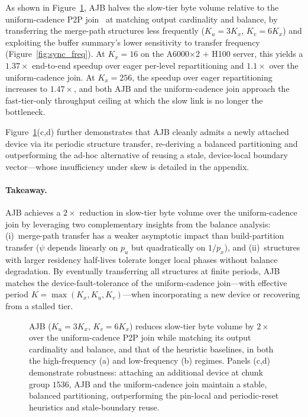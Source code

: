 \documentclass{article}
\begin{document}
As shown in Figure~\ref{fig:comms}, AJB halves the slow-tier byte volume
relative to the uniform-cadence P2P join~\citep{maltry2025multigpu} at matching
output cardinality and balance, by transferring the merge-path structures less
frequently ($K_u = 3K_x$, $K_v = 6K_x$) and exploiting the buffer summary's
lower sensitivity to transfer frequency (Figure~\ref{fig:sync_freq}). At $K_x =
16$ on the A6000$\times$2 $+$ H100 server, this yields a $1.37\times$ end-to-end
speedup over eager per-level repartitioning and $1.1\times$ over the
uniform-cadence join. At $K_x = 256$, the speedup over eager repartitioning
increases to $1.47\times$, and both AJB and the uniform-cadence join approach the
fast-tier-only throughput ceiling at which the slow link is no longer the
bottleneck.

Figure~\ref{fig:comms}(c,d) further demonstrates that AJB cleanly admits a newly
attached device via its periodic structure transfer, re-deriving a balanced
partitioning and outperforming the ad-hoc alternative of reusing a stale,
device-local boundary vector---whose insufficiency under skew is detailed in the
appendix.

\paragraph{Takeaway.}
AJB achieves a $2\times$ reduction in slow-tier byte volume over the
uniform-cadence join by leveraging two complementary insights from the balance
analysis: (i)~merge-path transfer has a weaker asymptotic impact than
build-partition transfer ($\psi$ depends linearly on $p_u$ but quadratically on
$1/p_x$), and (ii)~structures with larger residency half-lives tolerate longer
local phases without balance degradation. By eventually transferring all
structures at finite periods, AJB matches the device-fault-tolerance of the
uniform-cadence join---with effective period $K = \max(K_x, K_u, K_v)$---when
incorporating a new device or recovering from a stalled tier.

\begin{figure}[t]
\centering
\caption{AJB ($K_u = 3K_x$, $K_v = 6K_x$) reduces slow-tier byte volume by
$2\times$ over the uniform-cadence P2P join while matching its output cardinality
and balance, and that of the heuristic baselines, in both the high-frequency (a)
and low-frequency (b) regimes. Panels (c,d) demonstrate robustness: attaching an
additional device at chunk group $1536$, AJB and the uniform-cadence join
maintain a stable, balanced partitioning, outperforming the pin-local and
periodic-reset heuristics and stale-boundary reuse.}
\label{fig:comms}
\end{figure}
\end{document}
